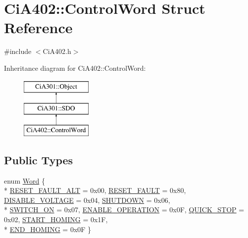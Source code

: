 \hypertarget{struct_ci_a402_1_1_control_word}{\section{Ci\-A402\-:\-:Control\-Word Struct Reference}
\label{struct_ci_a402_1_1_control_word}
}


{\ttfamily \#include $<$Ci\-A402.\-h$>$}

Inheritance diagram for Ci\-A402\-:\-:Control\-Word\-:\begin{figure}[H]
\begin{center}
\leavevmode
\includegraphics[height=3.000000cm]{db/dc0/struct_ci_a402_1_1_control_word}
\end{center}
\end{figure}
\subsection*{Public Types}
\begin{DoxyCompactItemize}
\item 
enum \hyperlink{struct_ci_a402_1_1_control_word_a4c55c383fb4ebea7f52beaea4d232117}{Word} \{ \\*
\hyperlink{struct_ci_a402_1_1_control_word_a4c55c383fb4ebea7f52beaea4d232117ab30005008b50d9507b743ca643420b3f}{R\-E\-S\-E\-T\-\_\-\-F\-A\-U\-L\-T\-\_\-\-A\-L\-T} = 0x00, 
\hyperlink{struct_ci_a402_1_1_control_word_a4c55c383fb4ebea7f52beaea4d232117a77baf485c83cefe07d3a20b09fae96c9}{R\-E\-S\-E\-T\-\_\-\-F\-A\-U\-L\-T} = 0x80, 
\hyperlink{struct_ci_a402_1_1_control_word_a4c55c383fb4ebea7f52beaea4d232117a6c917260d94a8de3e819af4c0263b444}{D\-I\-S\-A\-B\-L\-E\-\_\-\-V\-O\-L\-T\-A\-G\-E} = 0x04, 
\hyperlink{struct_ci_a402_1_1_control_word_a4c55c383fb4ebea7f52beaea4d232117a37ab2e6269aab87f52a97a8e416c61a5}{S\-H\-U\-T\-D\-O\-W\-N} = 0x06, 
\\*
\hyperlink{struct_ci_a402_1_1_control_word_a4c55c383fb4ebea7f52beaea4d232117a45c421bdf4ca74136d75749746e43633}{S\-W\-I\-T\-C\-H\-\_\-\-O\-N} = 0x07, 
\hyperlink{struct_ci_a402_1_1_control_word_a4c55c383fb4ebea7f52beaea4d232117ace0f737e010c25afdb7c0dc492ae9418}{E\-N\-A\-B\-L\-E\-\_\-\-O\-P\-E\-R\-A\-T\-I\-O\-N} = 0x0\-F, 
\hyperlink{struct_ci_a402_1_1_control_word_a4c55c383fb4ebea7f52beaea4d232117a2af57338e221c820d9b185377892546c}{Q\-U\-I\-C\-K\-\_\-\-S\-T\-O\-P} = 0x02, 
\hyperlink{struct_ci_a402_1_1_control_word_a4c55c383fb4ebea7f52beaea4d232117a9e9cf2581d933a889fcf6fe930ae2cf5}{S\-T\-A\-R\-T\-\_\-\-H\-O\-M\-I\-N\-G} = 0x1\-F, 
\\*
\hyperlink{struct_ci_a402_1_1_control_word_a4c55c383fb4ebea7f52beaea4d232117a36c382a0047273e3341c4f63b041d544}{E\-N\-D\-\_\-\-H\-O\-M\-I\-N\-G} = 0x0\-F
 \}
\end{DoxyCompactItemize}
